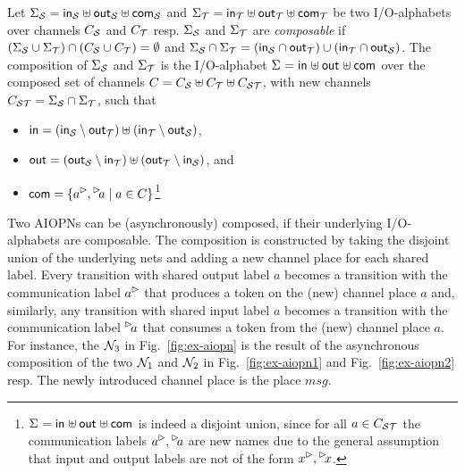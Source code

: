 \begin{definition}
    Let $\ioalpha{\S}$ and $\ioalpha{\T}$ be two I/O-alphabets over channels $\chan_\S$ and $\chan_\T$ resp. $\Sigma_\S$ and $\Sigma_\T$ are \emph{composable} if
$(\Sigma_\S \cup \Sigma_\T) \cap (\chan_\S \cup \chan_\T) = \emptyset$ and
$\Sigma_\S \cap \Sigma_\T = (\inset_\S \cap \outset_\T) \cup (\inset_\T \cap \outset_\S)$.%
The composition of $\Sigma_\S$ and $\Sigma_\T$ is the I/O-alphabet $\ioalpha{}$ over the composed set of channels $\chan = \chan_\S \uplus \chan_\T \uplus \chan_{\S\T}$, with new channels $\chan_{\S\T} = \Sigma_\S \cap \Sigma_\T$, such that
\begin{itemize}
        \item $\inset = (\inset_\S \setminus \outset_\T) \uplus (\inset_\T \setminus \outset_\S)$,
        \item $\outset = (\outset_\S \setminus \inset_\T) \uplus (\outset_\T \setminus \inset_\S)$, and
        \item $\com = \{\outact{a}, \inact{a} \mid a \in \chan \}$\footnote{$\ioalpha{}$ is indeed a disjoint union, since for all
$ a \in \chan_{\S\T}$ the communication labels $\outact{a}, \inact{a}$ are new names due to the general assumption that
input and output labels are not of the form  $\outact{x}, \inact{x}$.}

    \end{itemize}
\end{definition}

Two AIOPNs can be (asynchronously) composed, if their underlying I/O-alphabets are composable.
The composition is constructed by taking the disjoint union of the underlying nets and
adding a new channel place for each shared label.
Every transition with shared output label $a$ becomes a transition with the communication label $\outact{a}$
that produces a token on the (new) channel place $a$ and, similarly,  any transition with shared input label $a$ becomes a transition with the communication label $\inact{a}$
that consumes a token from the (new) channel place $a$.
For instance, the \AIOPN $\pnN_3$ in Fig.~\ref{fig:ex-aiopn} is the result of the asynchronous composition of the two \AIOPNs $\pnN_1$ and $\pnN_2$ in Fig.~\ref{fig:ex-aiopn1} and Fig.~\ref{fig:ex-aiopn2} resp. The newly introduced channel place is the place $msg$.

